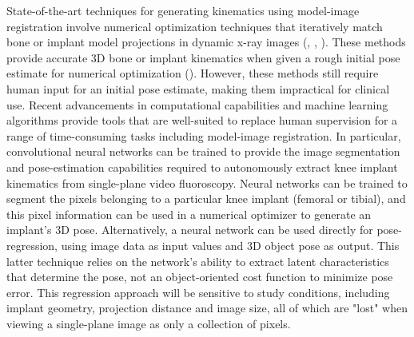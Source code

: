 State-of-the-art techniques for generating kinematics using model-image registration involve numerical optimization techniques that iteratively match bone or implant model projections in dynamic x-ray images (\cite{postolkaEvaluationIntensitybasedAlgorithm2020}, \cite{floodAutomatedRegistration3D2018}, \cite{tsaiVolumetricModelbased2D2010}). These methods provide accurate 3D bone or implant kinematics when given a rough initial pose estimate for numerical optimization (\cite{floodAutomatedRegistration3D2018}). However, these methods still require human input for an initial pose estimate, making them impractical for clinical use. 
Recent advancements in computational capabilities and machine learning algorithms provide tools that are well-suited to replace human supervision for a range of time-consuming tasks including model-image registration. In particular, convolutional neural networks can be trained to provide the image segmentation and pose-estimation capabilities required to autonomously extract knee implant kinematics from single-plane video fluoroscopy. Neural networks can be trained to segment the pixels belonging to a particular knee implant (femoral or tibial), and this pixel information can be used in a numerical optimizer to generate an implant's 3D pose. Alternatively, a neural network can be used directly for pose-regression, using image data as input values and 3D object pose as output. This latter technique relies on the network's ability to extract latent characteristics that determine the pose, not an object-oriented cost function to minimize pose error. This regression approach will be sensitive to study conditions, including implant geometry, projection distance and image size, all of which are "lost" when viewing a single-plane image as only a collection of pixels. 
